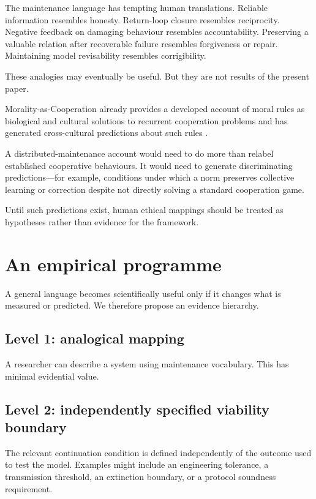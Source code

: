 The maintenance language has tempting human translations. Reliable information resembles honesty. Return-loop closure resembles reciprocity. Negative feedback on damaging behaviour resembles accountability. Preserving a valuable relation after recoverable failure resembles forgiveness or repair. Maintaining model revisability resembles corrigibility.

These analogies may eventually be useful. But they are not results of the present paper.

Morality-as-Cooperation already provides a developed account of moral rules as biological and cultural solutions to recurrent cooperation problems and has generated cross-cultural predictions about such rules \citep{curry2019mapping,curry2019societies}.

A distributed-maintenance account would need to do more than relabel established cooperative behaviours. It would need to generate discriminating predictions---for example, conditions under which a norm preserves collective learning or correction despite not directly solving a standard cooperation game.

Until such predictions exist, human ethical mappings should be treated as hypotheses rather than evidence for the framework.

\section{An empirical programme}

A general language becomes scientifically useful only if it changes what is measured or predicted. We therefore propose an evidence hierarchy.

\subsection{Level 1: analogical mapping}

A researcher can describe a system using maintenance vocabulary. This has minimal evidential value.

\subsection{Level 2: independently specified viability boundary}

The relevant continuation condition is defined independently of the outcome used to test the model. Examples might include an engineering tolerance, a transmission threshold, an extinction boundary, or a protocol soundness requirement.


